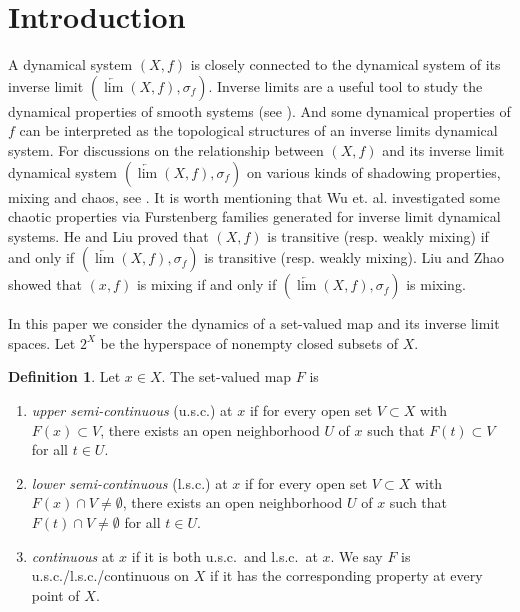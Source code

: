 \documentclass[12pt]{amsart}
\theoremstyle{definition}
\newtheorem{definition}[theorem]{Definition}
\begin{document}
\section{Introduction}
A dynamical system $(X,f)$ is closely connected to the dynamical system of its inverse limit $(\underleftarrow{\lim}(X,f), \sigma_f)$. Inverse limits are a useful tool to study the dynamical properties of smooth systems (see \cite{Williams1967}). %
And some dynamical properties of $f$ can be interpreted as the topological structures of an inverse limits dynamical system\cite{Akin1997}. For discussions on the relationship between $(X,f)$ and its inverse limit dynamical system $(\underleftarrow{\lim}(X,f), \sigma_f)$ on various kinds of shadowing properties, mixing and chaos, see \cite{Liu2013}. It is worth mentioning that Wu et. al. \cite{Wu2014} investigated some chaotic properties via Furstenberg families generated for inverse limit dynamical systems. He and Liu \cite{He1999} proved that $(X, f)$ is transitive (resp. weakly mixing) if and only if $(\underleftarrow{\lim}(X,f), \sigma_f)$ is transitive (resp. weakly mixing). Liu and Zhao \cite{Liu2013} showed that $(x,f)$ is mixing if and only if $(\underleftarrow{\lim}(X,f), \sigma_f)$ is mixing.



In this paper we consider the dynamics of a set-valued map and its inverse limit spaces. Let $2^X$ be the hyperspace of nonempty closed subsets of $X$. 

\begin{definition}\label{def-cts-svm-all}
	Let $x\in X$.  The set-valued map $F$ is
	\begin{enumerate}
		\item[(1)] \emph{upper semi-continuous} (u.s.c.) at $x$ if for every open set $V\subset X$ with $F(x)\subset V$, there exists an open neighborhood $U$ of $x$ such that $F(t)\subset V$ for all $t\in U$.
		\item[(2)] \emph{lower semi-continuous} (l.s.c.) at $x$ if for every open set $V\subset X$ with $F(x)\cap V\neq\emptyset$, there exists an open neighborhood $U$ of $x$ such that $F(t)\cap V\neq\emptyset$ for all $t\in U$.
		\item[(3)] \emph{continuous} at $x$ if it is both u.s.c.\ and l.s.c.\ at $x$. We say $F$ is u.s.c./l.s.c./continuous on $X$ if it has the corresponding property at every point of $X$.
	\end{enumerate}
\end{definition}
\end{document}
